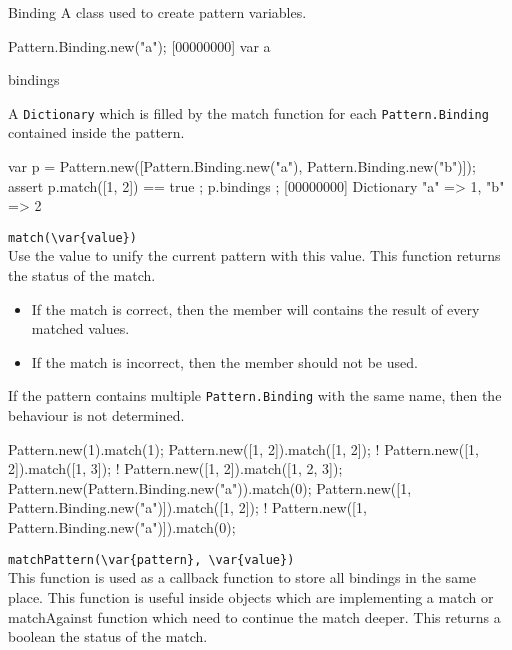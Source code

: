 \begin{urbiscriptapi}

\item[Binding]
  A class used to create pattern variables.

\begin{urbiscript}
Pattern.Binding.new("a");
[00000000] var a
\end{urbiscript}

\item[bindings]

  A \lstinline|Dictionary| which is filled by the match function for each
  \lstinline|Pattern.Binding| contained inside the pattern.

\begin{urbiscript}
{
  var p = Pattern.new([Pattern.Binding.new("a"), Pattern.Binding.new("b")]);
  assert {
    p.match([1, 2]) == true
  };
  p.bindings
};
[00000000] Dictionary {"a" => 1, "b" => 2}
\end{urbiscript}


\item \lstinline|match(\var{value})|\\

  Use the value to unify the current pattern with this value.  This function
  returns the status of the match.
  \begin{itemize}
    \item If the match is correct, then the  member will
      contains the result of every matched values.
    \item If the match is incorrect, then the  member should
      not be used.
  \end{itemize}
  If the pattern contains multiple \lstinline|Pattern.Binding| with the same
  name, then the behaviour is not determined.

\begin{urbiassert}
Pattern.new(1).match(1);
Pattern.new([1, 2]).match([1, 2]);
! Pattern.new([1, 2]).match([1, 3]);
! Pattern.new([1, 2]).match([1, 2, 3]);
Pattern.new(Pattern.Binding.new("a")).match(0);
Pattern.new([1, Pattern.Binding.new("a")]).match([1, 2]);
! Pattern.new([1, Pattern.Binding.new("a")]).match(0);
\end{urbiassert}


\item \lstinline|matchPattern(\var{pattern}, \var{value})|\\

  This function is used as a callback function to store all bindings in the
  same place.  This function is useful inside objects which are implementing
  a match or matchAgainst function which need to continue the match deeper.
  This returns a boolean the status of the match.


\end{urbiscriptapi}
